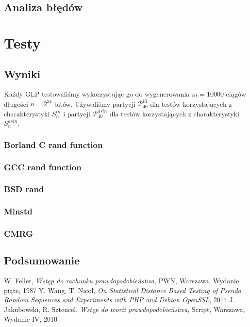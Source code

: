 \documentclass[a4paper,11pt,oneside]{book}
\newcommand{\Slil}[1]{S^{lil}_#1}
\newcommand{\Sasin}[1]{S^{asin}_#1}
\theoremstyle{definition}
\begin{document}
\section{Analiza błędów}


\chapter{Testy}
\label{czesc:testy}

\section{Wyniki}
Każdy GLP testowaliśmy wykorzystując go do wygenerowania $m = 10000$ ciągów długości $n = 2^{34}$ bitów. Używaliśmy partycji $\mathcal{P}^{lil}_{40}$ dla testów korzystających z charakterystyki $\Slil{n}$ i partycji $\mathcal{P}^{asin}_{40}$ dla testów korzystających z charakterystyki $\Sasin{n}$.

\subsection{Borland C rand function}

\subsection{GCC rand function}

\subsection{BSD rand}

\subsection{Minstd}

\subsection{CMRG}

\section{Podsumowanie}


\begin{thebibliography}{99}
    W. Feller, \emph{Wstęp do rachunku prawdopodobieństwa}, PWN, Warszawa, Wydanie piąte, 1987
    Y. Wang, T. Nicol, \emph{On Statistical Distance Based Testing of Pseudo Random Sequences and Experiments with PHP and Debian OpenSSL}, 2014
    J. Jakubowski, R. Sztencel, \emph{Wstęp do teorii prawdopodobieństwa}, Script, Warszawa, Wydanie IV, 2010

\end{thebibliography}
\end{document}
